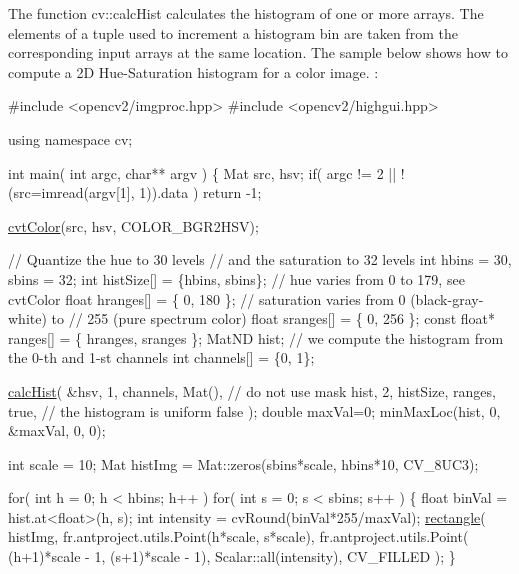 The function cv\+::calc\+Hist calculates the histogram of one or more arrays. The elements of a tuple used to increment a histogram bin are taken from the corresponding input arrays at the same location. The sample below shows how to compute a 2D Hue-\/\+Saturation histogram for a color image. \+: 
\begin{DoxyPre}
\begin{DoxyCode}
\textcolor{preprocessor}{#include <opencv2/imgproc.hpp>}
\textcolor{preprocessor}{#include <opencv2/highgui.hpp>}

\textcolor{keyword}{using namespace }cv;

\textcolor{keywordtype}{int} main( \textcolor{keywordtype}{int} argc, \textcolor{keywordtype}{char}** argv )
\{
    Mat src, hsv;
    \textcolor{keywordflow}{if}( argc != 2 || !(src=imread(argv[1], 1)).data )
        \textcolor{keywordflow}{return} -1;

    \hyperlink{group__imgproc__misc_gaab99985581c43cce9df680e6586cb9ef}{cvtColor}(src, hsv, COLOR\_BGR2HSV);

    \textcolor{comment}{// Quantize the hue to 30 levels}
    \textcolor{comment}{// and the saturation to 32 levels}
    \textcolor{keywordtype}{int} hbins = 30, sbins = 32;
    \textcolor{keywordtype}{int} histSize[] = \{hbins, sbins\};
    \textcolor{comment}{// hue varies from 0 to 179, see cvtColor}
    \textcolor{keywordtype}{float} hranges[] = \{ 0, 180 \};
    \textcolor{comment}{// saturation varies from 0 (black-gray-white) to}
    \textcolor{comment}{// 255 (pure spectrum color)}
    \textcolor{keywordtype}{float} sranges[] = \{ 0, 256 \};
    \textcolor{keyword}{const} \textcolor{keywordtype}{float}* ranges[] = \{ hranges, sranges \};
    MatND hist;
    \textcolor{comment}{// we compute the histogram from the 0-th and 1-st channels}
    \textcolor{keywordtype}{int} channels[] = \{0, 1\};

    \hyperlink{group__imgproc__hist_ga5d3d264cae4eeaf1ffac100661154b5a}{calcHist}( &hsv, 1, channels, Mat(), \textcolor{comment}{// do not use mask}
             hist, 2, histSize, ranges,
             \textcolor{keyword}{true}, \textcolor{comment}{// the histogram is uniform}
             \textcolor{keyword}{false} );
    \textcolor{keywordtype}{double} maxVal=0;
    minMaxLoc(hist, 0, &maxVal, 0, 0);

    \textcolor{keywordtype}{int} scale = 10;
    Mat histImg = Mat::zeros(sbins*scale, hbins*10, CV\_8UC3);

    \textcolor{keywordflow}{for}( \textcolor{keywordtype}{int} h = 0; h < hbins; h++ )
        \textcolor{keywordflow}{for}( \textcolor{keywordtype}{int} s = 0; s < sbins; s++ )
        \{
            \textcolor{keywordtype}{float} binVal = hist.at<\textcolor{keywordtype}{float}>(h, s);
            \textcolor{keywordtype}{int} intensity = cvRound(binVal*255/maxVal);
            \hyperlink{group__imgproc__draw_ga011e780e69d07eab5e5e6ac46d4d8dde}{rectangle}( histImg, fr.antproject.utils.Point(h*scale, s*scale),
                        fr.antproject.utils.Point( (h+1)*scale - 1, (s+1)*scale - 1),
                        Scalar::all(intensity),
                        CV\_FILLED );
        \}


\end{DoxyCode}
\end{DoxyPre}
